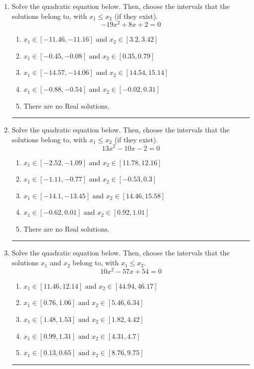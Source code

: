 \documentclass[14pt]{extbook}
\newcommand{\litem}[1]{\item#1\hspace*{-1cm}\rule{\textwidth}{0.4pt}}
\begin{document}
\begin{enumerate}
{\begin{enumerate}[label=\Alph*.]
\end{enumerate} }
\litem{
Solve the quadratic equation below. Then, choose the intervals that the solutions belong to, with $x_1 \leq x_2$ (if they exist).\[ -19x^{2} +8 x + 2 = 0 \]\begin{enumerate}[label=\Alph*.]
\item \( x_1 \in [-11.46, -11.16] \text{ and } x_2 \in [3.2, 3.42] \)
\item \( x_1 \in [-0.45, -0.08] \text{ and } x_2 \in [0.35, 0.79] \)
\item \( x_1 \in [-14.57, -14.06] \text{ and } x_2 \in [14.54, 15.14] \)
\item \( x_1 \in [-0.88, -0.54] \text{ and } x_2 \in [-0.02, 0.31] \)
\item \( \text{There are no Real solutions.} \)

\end{enumerate} }
\litem{
Solve the quadratic equation below. Then, choose the intervals that the solutions belong to, with $x_1 \leq x_2$ (if they exist).\[ 13x^{2} -10 x -2 = 0 \]\begin{enumerate}[label=\Alph*.]
\item \( x_1 \in [-2.52, -1.09] \text{ and } x_2 \in [11.78, 12.16] \)
\item \( x_1 \in [-1.11, -0.77] \text{ and } x_2 \in [-0.53, 0.3] \)
\item \( x_1 \in [-14.1, -13.45] \text{ and } x_2 \in [14.46, 15.58] \)
\item \( x_1 \in [-0.62, 0.01] \text{ and } x_2 \in [0.92, 1.01] \)
\item \( \text{There are no Real solutions.} \)

\end{enumerate} }
\litem{
Solve the quadratic equation below. Then, choose the intervals that the solutions $x_1$ and $x_2$ belong to, with $x_1 \leq x_2$.\[ 10x^{2} -57 x + 54 = 0 \]\begin{enumerate}[label=\Alph*.]
\item \( x_1 \in [11.46, 12.14] \text{ and } x_2 \in [44.94, 46.17] \)
\item \( x_1 \in [0.76, 1.06] \text{ and } x_2 \in [5.46, 6.34] \)
\item \( x_1 \in [1.48, 1.53] \text{ and } x_2 \in [1.82, 4.42] \)
\item \( x_1 \in [0.99, 1.31] \text{ and } x_2 \in [4.31, 4.7] \)
\item \( x_1 \in [0.13, 0.65] \text{ and } x_2 \in [8.76, 9.75] \)


\end{enumerate}}
\end{enumerate}
\end{document}
